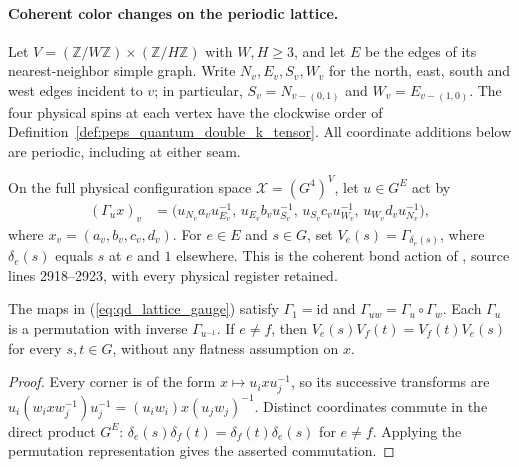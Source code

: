 \paragraph{Coherent color changes on the periodic lattice.}
Let $V=(\mathbb Z/W\mathbb Z)\times(\mathbb Z/H\mathbb Z)$ with $W,H\geq3$, and let $E$ be the edges of its nearest-neighbor simple graph.
Write $N_v,E_v,S_v,W_v$ for the north, east, south and west edges incident to $v$; in particular, $S_v=N_{v-(0,1)}$ and $W_v=E_{v-(1,0)}$.
The four physical spins at each vertex have the clockwise order of Definition~\ref{def:peps_quantum_double_k_tensor}.
All coordinate additions below are periodic, including at either seam.

\begin{definition}
    \label{def:peps_qd_lattice_gauge}
    On the full physical configuration space $\mathcal X=(G^4)^V$, let $u\in G^E$ act by
    \begin{align}
        (\Gamma_u x)_v
        & =\bigl(u_{N_v}a_vu_{E_v}^{-1},\,
        u_{E_v}b_vu_{S_v}^{-1},\,
        u_{S_v}c_vu_{W_v}^{-1},\,
        u_{W_v}d_vu_{N_v}^{-1}\bigr),
        \label{eq:qd_lattice_gauge}
    \end{align}
    where $x_v=(a_v,b_v,c_v,d_v)$.
    For $e\in E$ and $s\in G$, set $V_e(s)=\Gamma_{\delta_e(s)}$, where $\delta_e(s)$ equals $s$ at $e$ and $1$ elsewhere.
    This is the coherent bond action of \cite{Schuch2010PEPS}, source lines 2918--2923, with every physical register retained.
\end{definition}

\begin{lemma}
    \label{lem:peps_qd_lattice_gauge_action}
    The maps in (\ref{eq:qd_lattice_gauge}) satisfy $\Gamma_1=\mathrm{id}$ and $\Gamma_{uw}=\Gamma_u\circ\Gamma_w$.
    Each $\Gamma_u$ is a permutation with inverse $\Gamma_{u^{-1}}$.
    If $e\ne f$, then $V_e(s)V_f(t)=V_f(t)V_e(s)$ for every $s,t\in G$, without any flatness assumption on $x$.
\end{lemma}
\begin{proof}
    Every corner is of the form $x\mapsto u_ixu_j^{-1}$, so its successive transforms are $u_i(w_ixw_j^{-1})u_j^{-1}=(u_iw_i)x(u_jw_j)^{-1}$.
    Distinct coordinates commute in the direct product $G^E$: $\delta_e(s)\delta_f(t)=\delta_f(t)\delta_e(s)$ for $e\ne f$.
    Applying the permutation representation gives the asserted commutation.
\end{proof}


